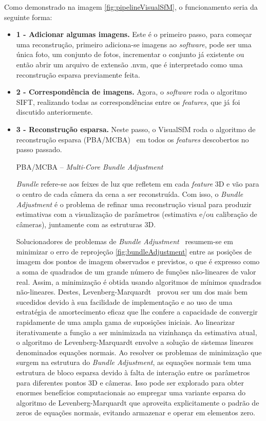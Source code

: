 Como demonstrado na imagem \ref{fig:pipelineVisualSfM}, o funcionamento seria da seguinte forma:

\begin{itemize}
\item \textbf{1 - Adicionar algumas imagens.} Este é o primeiro passo, para começar uma reconstrução, primeiro adiciona-se imagens ao \emph{software}, pode ser uma única foto, um conjunto de fotos, incrementar o conjunto já existente ou então abrir um arquivo de extensão .nvm, que é interpretado como uma reconstrução esparsa previamente feita.

\item \textbf{2 - Correspondência de imagens.} Agora, o \emph{software} roda o algoritmo SIFT, realizando todas as correspondências entre os \emph{features}, que já foi discutido anteriormente.

\item \textbf{3 - Reconstrução esparsa.} Neste passo, o VisualSfM roda o algoritmo de reconstrução esparsa (PBA/MCBA)~\cite{wu2011multicore} em todos os \emph{features} descobertos no passo passado. 


PBA/MCBA -- \emph{Multi-Core Bundle Adjustment}\label{pba}

\emph{Bundle} refere-se aos feixes de luz que refletem em cada \emph{feature} 3D e vão para o centro de cada câmera da cena a ser reconstruída. Com isso, o \emph{Bundle Adjustment} é o problema de refinar uma reconstrução visual para produzir estimativas com a visualização de parâmetros (estimativa e/ou calibração de câmeras), juntamente com as estruturas 3D.

Solucionadores de problemas de \emph{Bundle Adjustment}~\cite{bundleAdjustmentSlide} resumem-se em minimizar o erro de reprojeção \ref{fig:bundleAdjustment} entre as posições de imagem dos pontos de imagem observados e previstos, o que é expresso como a soma de quadrados de um grande número de funções não-lineares de valor real. Assim, a minimização é obtida usando algoritmos de mínimos quadrados não-lineares. Destes, Levenberg-Marquardt~\cite{more1978levenberg} provou ser um dos mais bem sucedidos devido à sua facilidade de implementação e ao uso de uma estratégia de amortecimento eficaz que lhe confere a capacidade de convergir rapidamente de uma ampla gama de suposições iniciais. Ao linearizar iterativamente a função a ser minimizada na vizinhança da estimativa atual, o algoritmo de Levenberg-Marquardt envolve a solução de sistemas lineares denominados equações normais. Ao resolver os problemas de minimização que surgem na estrutura do \emph{Bundle Adjustment}, as equações normais tem uma estrutura de bloco esparsa devido à falta de interação entre os parâmetros para diferentes pontos 3D e câmeras. Isso pode ser explorado para obter enormes benefícios computacionais ao empregar uma variante esparsa do algoritmo de Levenberg-Marquardt que aproveita explicitamente o padrão de zeros de equações normais, evitando armazenar e operar em elementos zero.


\end{itemize}
